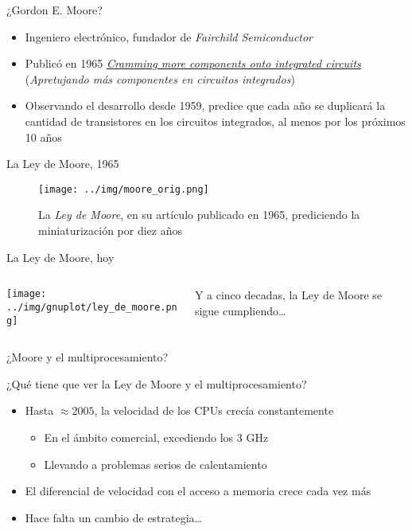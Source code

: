 \documentclass[presentation]{beamer}
\begin{document}
\begin{frame}[label={sec:org2a73e8e}]{¿Gordon E. Moore?}
\begin{itemize}
\item Ingeniero electrónico, fundador de \emph{Fairchild Semiconductor}
\item Publicó en 1965 \emph{\href{http://cs.utexas.edu/\~fussell/courses/cs352h/papers/moore.pdf}{Cramming more components onto integrated circuits}}
(\emph{Apretujando más componentes en circuitos integrados})
\item Observando el desarrollo desde 1959, predice que cada año se
duplicará la cantidad de transistores en los circuitos integrados,
al menos por los próximos 10 años
\end{itemize}
\end{frame}

\begin{frame}[label={sec:orgbe4cfe1}]{La Ley de Moore, 1965}
\begin{figure}[htbp]
\centering
\texttt{[image: ../img/moore\_orig.png]}
\caption{La \emph{Ley de Moore}, en su artículo publicado en 1965, prediciendo la miniaturización por diez años}
\end{figure}
\end{frame}

\begin{frame}[label={sec:org355ff15}]{La Ley de Moore, hoy}
\begin{columns}\begin{column}{0.7\textwidth}
\begin{center}
\texttt{[image: ../img/gnuplot/ley\_de\_moore.png]}
\end{center}
\end{column}\begin{column}{0.3\textwidth}
\begin{center}
Y a cinco decadas, la Ley de Moore se sigue cumpliendo\ldots{}
\end{center}
\end{column}\end{columns}
\end{frame}

\begin{frame}[label={sec:org56ebf15}]{¿Moore y el multiprocesamiento?}
\begin{center}
¿Qué tiene que ver la Ley de Moore y el multiprocesamiento?
\end{center}
\begin{itemize}
\item Hasta \(\approx 2005\), la velocidad de los CPUs crecía constantemente
\begin{itemize}
\item En el ámbito comercial, excediendo los 3 GHz
\item Llevando a problemas serios de calentamiento
\end{itemize}
\item El diferencial de velocidad con el acceso a memoria crece cada vez
más
\item Hace falta un cambio de estrategia\ldots{}
\end{itemize}
\end{frame}
\end{document}
